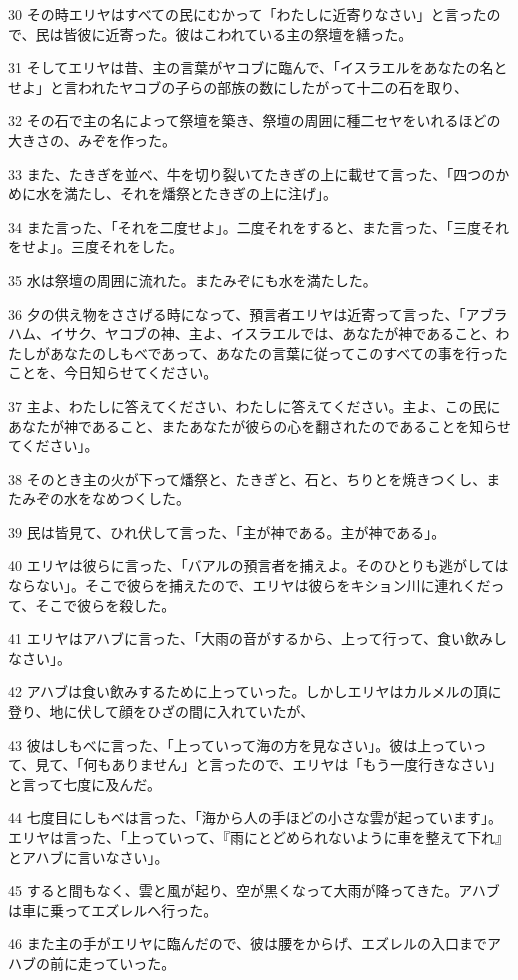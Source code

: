 \par 30 その時エリヤはすべての民にむかって「わたしに近寄りなさい」と言ったので、民は皆彼に近寄った。彼はこわれている主の祭壇を繕った。
\par 31 そしてエリヤは昔、主の言葉がヤコブに臨んで、「イスラエルをあなたの名とせよ」と言われたヤコブの子らの部族の数にしたがって十二の石を取り、
\par 32 その石で主の名によって祭壇を築き、祭壇の周囲に種二セヤをいれるほどの大きさの、みぞを作った。
\par 33 また、たきぎを並べ、牛を切り裂いてたきぎの上に載せて言った、「四つのかめに水を満たし、それを燔祭とたきぎの上に注げ」。
\par 34 また言った、「それを二度せよ」。二度それをすると、また言った、「三度それをせよ」。三度それをした。
\par 35 水は祭壇の周囲に流れた。またみぞにも水を満たした。
\par 36 夕の供え物をささげる時になって、預言者エリヤは近寄って言った、「アブラハム、イサク、ヤコブの神、主よ、イスラエルでは、あなたが神であること、わたしがあなたのしもべであって、あなたの言葉に従ってこのすべての事を行ったことを、今日知らせてください。
\par 37 主よ、わたしに答えてください、わたしに答えてください。主よ、この民にあなたが神であること、またあなたが彼らの心を翻されたのであることを知らせてください」。
\par 38 そのとき主の火が下って燔祭と、たきぎと、石と、ちりとを焼きつくし、またみぞの水をなめつくした。
\par 39 民は皆見て、ひれ伏して言った、「主が神である。主が神である」。
\par 40 エリヤは彼らに言った、「バアルの預言者を捕えよ。そのひとりも逃がしてはならない」。そこで彼らを捕えたので、エリヤは彼らをキション川に連れくだって、そこで彼らを殺した。
\par 41 エリヤはアハブに言った、「大雨の音がするから、上って行って、食い飲みしなさい」。
\par 42 アハブは食い飲みするために上っていった。しかしエリヤはカルメルの頂に登り、地に伏して顔をひざの間に入れていたが、
\par 43 彼はしもべに言った、「上っていって海の方を見なさい」。彼は上っていって、見て、「何もありません」と言ったので、エリヤは「もう一度行きなさい」と言って七度に及んだ。
\par 44 七度目にしもべは言った、「海から人の手ほどの小さな雲が起っています」。エリヤは言った、「上っていって、『雨にとどめられないように車を整えて下れ』とアハブに言いなさい」。
\par 45 すると間もなく、雲と風が起り、空が黒くなって大雨が降ってきた。アハブは車に乗ってエズレルへ行った。
\par 46 また主の手がエリヤに臨んだので、彼は腰をからげ、エズレルの入口までアハブの前に走っていった。

